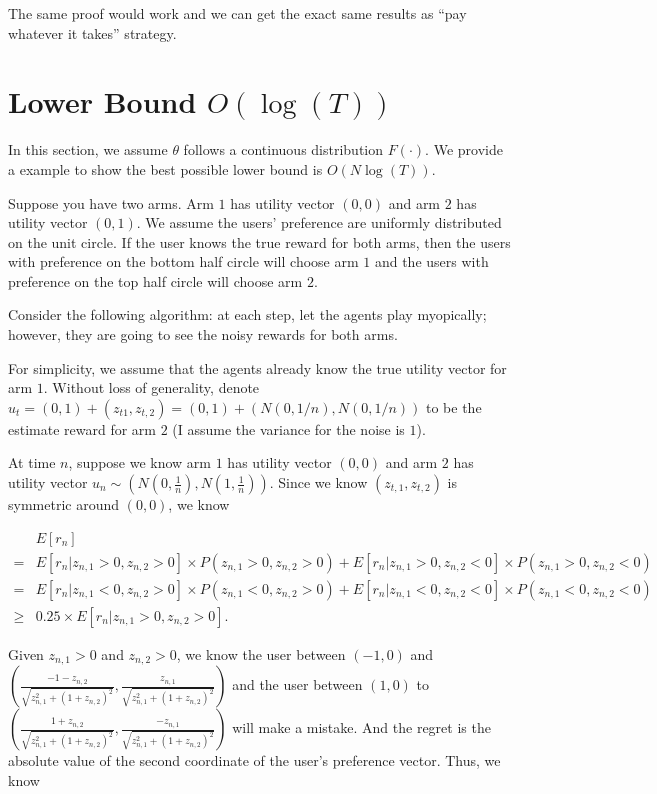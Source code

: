 \documentclass{article}
\begin{document}
The same proof would work and we can get the exact same results as ``pay whatever it takes'' strategy. 

\section{Lower Bound $O(\log(T))$}
\label{sec:lb}

In this section, we assume $\theta$ follows a continuous distribution $F(\cdot)$. We provide a example to show the best possible lower bound is $O(N\log(T))$.

Suppose you have two arms. Arm $1$ has utility vector $(0,0)$ and arm $2$ has utility vector $(0,1)$. We assume the users' preference are uniformly distributed on the unit circle. If the user knows the true reward for both arms, then the users with preference on the bottom half circle will choose arm $1$ and the users with preference on the top half circle will choose arm $2$.


Consider the following algorithm: at each step, let the agents play myopically; however, they are going to see the noisy rewards for both arms.

For simplicity, we assume that the agents already know the true utility vector for arm $1$. Without loss of generality, denote $u_{t} = (0,1)+(z_{t1},z_{t,2}) = (0,1)+ (N(0,1/n),N(0,1/n))$ to be the estimate reward for arm $2$ (I assume the variance for the noise is $1$). 


At time $n$, suppose we know arm $1$ has utility vector $(0,0)$ and arm $2$ has utility vector $u_n\sim (N(0,\frac{1}{n}), N(1,\frac{1}{n}))$. Since we know $(z_{t,1}, z_{t,2})$ is symmetric around $(0,0)$, we know 

\begin{align}
&E[r_n] \nonumber \\
= &E[r_n | z_{n,1}>0,z_{n,2}>0] \times P(z_{n,1}>0,z_{n,2}>0) + E[r_n |z_{n,1}>0,z_{n,2}<0] \times P(z_{n,1}>0,z_{n,2}<0) \nonumber \\
= &E[r_n | z_{n,1}<0,z_{n,2}>0] \times P(z_{n,1}<0,z_{n,2}>0) + E[r_n |z_{n,1}<0,z_{n,2}<0] \times P(z_{n,1}<0,z_{n,2}<0) \nonumber \\
\geq & 0.25 \times E[r_n | z_{n,1}>0, z_{n,2}>0]. \nonumber
\end{align}

Given $z_{n,1}>0$ and $z_{n,2}>0$, we know the user between $(-1,0)$ and $(\frac{-1-z_{n,2}}{\sqrt{z_{n,1}^2+(1+z_{n,2})^2}}, \frac{z_{n,1}}{\sqrt{z_{n,1}^2+(1+z_{n,2})^2}})$ and the user between $(1,0)$ to $(\frac{1+z_{n,2}}{\sqrt{z_{n,1}^2+(1+z_{n,2})^2}}, \frac{-z_{n,1}}{\sqrt{z_{n,1}^2+(1+z_{n,2})^2}})$ will make a mistake. And the regret is the absolute value of the second coordinate of the user's preference vector. Thus, we know
\end{document}
